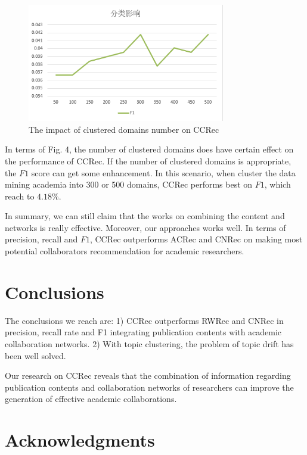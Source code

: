 \documentclass{acm_proc_article-sp}
\begin{document}
\begin{figure}
\centering
\includegraphics [width=3.4in]{Fig4}
\caption{The impact of clustered domains number on CCRec}
\end{figure}

In terms of Fig. 4, the number of clustered domains does have certain effect on the performance of CCRec. If the number of clustered domains is appropriate, the $F1$ score can get some enhancement. In this scenario, when cluster the data mining academia into 300 or 500 domains, CCRec performs best on $F1$, which reach to $4.18\%$.

In summary, we can still claim that the works on combining the content and networks is really effective. Moreover, our approaches works well. In terms of precision, recall and $F1$, CCRec outperforms ACRec and CNRec on making most potential collaborators recommendation for academic researchers.
\section{Conclusions}
The conclusions we reach are: 1) CCRec outperforms RWRec and CNRec in precision, recall rate and F1 integrating publication contents with academic collaboration networks. 2) With topic clustering, the problem of topic drift has been well solved.

Our research on CCRec reveals that the combination of information regarding publication contents and collaboration networks of researchers can improve the generation of effective academic collaborations.

\section{Acknowledgments}



\balancecolumns
\end{document}
